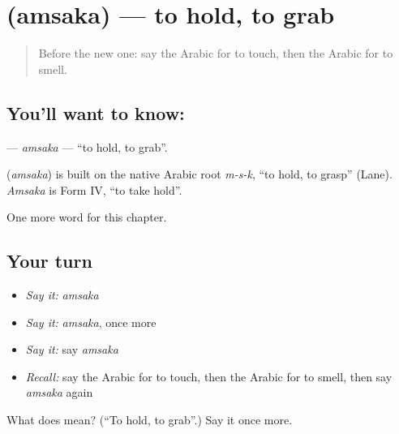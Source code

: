 \section[\texorpdfstring{\ar{أمسك} (amsaka)}{أمسك (amsaka)}]{ (amsaka) — to hold, to grab}

\label{lesson:AR-C194-amsaka}



\begin{quote}
Before the new one: say the Arabic for to touch, then the Arabic for to smell.
\end{quote}

\subsection*{You'll want to know: }
\textbf{} — \emph{amsaka} — \textquotedblleft{}to hold, to grab\textquotedblright{}.

\begin{cousinweb}
\textbf{} (\emph{amsaka}) is built on the native Arabic root \emph{m-s-k}, \textquotedblleft{}to hold, to grasp\textquotedblright{} (Lane). \emph{Amsaka} is Form IV, \textquotedblleft{}to take hold\textquotedblright{}.
\end{cousinweb}

\begin{grammarlens}[title={What you've built}]
One more word for this chapter.
\end{grammarlens}

\subsection*{Your turn}
\begin{itemize}
\raggedright
  \item \emph{Say it:} \emph{amsaka}
  \item \emph{Say it:} \emph{amsaka}, once more
  \item \emph{Say it:} say \emph{amsaka}
  \item \emph{Recall:} say the Arabic for to touch, then the Arabic for to smell, then say \emph{amsaka} again
\end{itemize}

\begin{tcolorbox}[breakable,colback=teal!4,colframe=teal!35!black,title={Before you move on}]
What does  mean? (\textquotedblleft{}To hold, to grab\textquotedblright{}.) Say it once more.
\end{tcolorbox}
